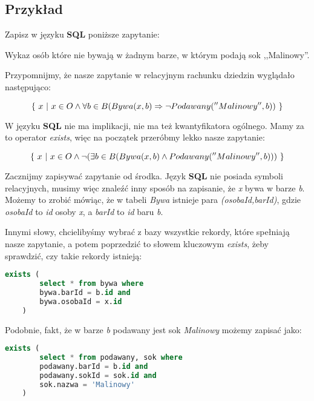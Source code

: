 \subsection{Przykład}

\begin{example}
    Zapisz w języku \textbf{SQL} poniższe zapytanie:

    Wykaz osób które nie bywają w żadnym barze, w którym podają sok ,,Malinowy''.
    
    Przypomnijmy, że nasze zapytanie w relacyjnym rachunku dziedzin wyglądało następująco:
    
     \[
        \{\ x\ |\ x \in O \wedge \forall{b \in B} (Bywa(x,b) \Rightarrow \neg Podawany(''Malinowy'',b))\ \}
    \]
    
    W języku \textbf{SQL} nie ma implikacji, nie ma też kwantyfikatora ogólnego. Mamy za to operator \textit{exists}, więc na początek przeróbmy lekko nasze zapytanie:
    
     \[
        \{\ x\ |\ x \in O \wedge \neg (\exists{b \in B} (Bywa(x,b) \wedge Podawany(''Malinowy'',b)))\ \}
    \]
    
   Zacznijmy zapisywać zapytanie od środka. Język \textbf{SQL} nie posiada symboli relacyjnych, musimy więc znaleźć inny sposób na zapisanie, że \textit{x} bywa w barze \textit{b}. Możemy to zrobić mówiąc, że w tabeli \textit{Bywa} istnieje para \textit{(osobaId,barId)}, gdzie \textit{osobaId} to \textit{id} osoby \textit{x}, a \textit{barId} to \textit{id} baru \textit{b}.
   
   Innymi słowy, chcielibyśmy wybrać z bazy wszystkie rekordy, które spełniają nasze zapytanie, a potem poprzedzić to słowem kluczowym \textit{exists}, żeby sprawdzić, czy takie rekordy istnieją:
   
    \begin{lstlisting}[language=SQL, breaklines=true]
    exists (
        select * from bywa where 
        bywa.barId = b.id and 
        bywa.osobaId = x.id 
    )
    \end{lstlisting}
    
    Podobnie, fakt, że w barze \textit{b} podawany jest sok \textit{Malinowy} możemy zapisać jako:
    
    \begin{lstlisting}[language=SQL, breaklines=true]
    exists (
        select * from podawany, sok where 
        podawany.barId = b.id and 
        podawany.sokId = sok.id and 
        sok.nazwa = 'Malinowy'
    )
    \end{lstlisting}
    

\end{example}
